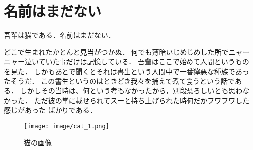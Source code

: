 \section{名前はまだない}
吾輩は猫である．名前はまだない．

どこで生まれたかとんと見当がつかぬ．
何でも薄暗いじめじめした所でニャーニャー泣いていた事だけは記憶している．
吾輩はここで始めて人間というものを見た．
しかもあとで聞くとそれは書生という人間中で一番獰悪な種族であったそうだ．
この書生というのはときどき我々を捕えて煮て食うという話である．
しかしその当時は、何という考もなかったから，別段恐ろしいとも思わなかった．
ただ彼の掌に載せられてスーと持ち上げられた時何だかフワフワした感じがあった
ばかりである．

\begin{figure}
    \centering
    \texttt{[image: image/cat\_1.png]}
    \caption{猫の画像 \cite{Freecatp65:online}}
    \label{fig:cat}
\end{figure}
